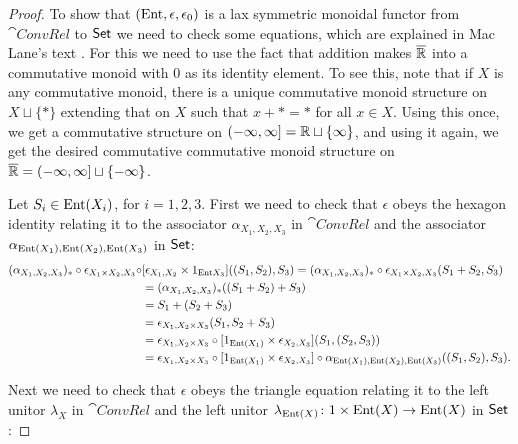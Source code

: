 \documentclass[12pt, reqno]{amsart}
\newcommand{\extreal}{\overline{\real}}
\newcommand{\convrelC}{\cat{ConvRel}}
\begin{document}
\begin{proof}
    To show that $(\mathrm{Ent},\epsilon,\epsilon_0)$ is a lax symmetric monoidal functor from $\convrelC$ to $\mathsf{Set}$ we need to check some equations, which are explained in Mac Lane's text \cite{MacLane}. For this we need to use the fact that addition makes $\extreal$ into a commutative monoid with $0$ as its identity element. To see this, note that if $X$ is any commutative monoid, there is a unique commutative monoid structure on $X \sqcup \{\ast\}$ extending that on $X$ such that $x + \ast = \ast$ for all $x \in X$. Using this once, we get a commutative structure on $(-\infty,\infty] = \mathbb{R} \sqcup \{\infty\}$, and using it again, we get the desired commutative commutative monoid structure on $\extreal = (-\infty,\infty] \sqcup \{-\infty\}$. 
    
    Let $S_i \in \mathrm{Ent}(X_i)$, for $i=1,2,3$. First we need to check that $\epsilon$ obeys the hexagon identity relating it to the associator $\alpha_{X_1,X_2,X_3}$ in $\convrelC$ and the associator $\alpha_{\mathrm{Ent}(X_1),\mathrm{Ent}(X_2),\mathrm{Ent}(X_3)}$ in $\mathsf{Set}$:
\begin{align*}
        (\alpha_{X_1, X_2, X_3})_* \circ \epsilon_{X_1 \times X_2, X_3} \circ & [\epsilon_{X_1, X_2} \times 1_{\mathrm{Ent} X_3}] ((S_1, S_2), S_3)
        = (\alpha_{X_1, X_2, X_3})_* \circ \epsilon_{X_1 \times X_2, X_3} (S_1+S_2, S_3) \\
  &= (\alpha_{X_1, X_2, X_3})_* ((S_1+S_2)+S_3) \\
&= S_1+(S_2+S_3) \\
&= \epsilon_{X_1, X_2 \times X_3} (S_1, S_2+S_3) \\
&=  \epsilon_{X_1, X_2 \times X_3} \circ [1_{\mathrm{Ent}(X_1)} \times \epsilon_{X_2, X_3}] (S_1, (S_2, S_3)) \\
&= \epsilon_{X_1, X_2 \times X_3} \circ [1_{\mathrm{Ent}(X_1)} \times \epsilon_{X_2, X_3}] \circ \alpha_{\mathrm{Ent}(X_1), \mathrm{Ent}(X_2), \mathrm{Ent}(X_3)}((S_1, S_2), S_3).
\end{align*}
    
Next we need to check that $\epsilon$ obeys the triangle equation relating it to the left unitor $\lambda_X$ in $\convrelC$ and the left unitor $\lambda_{\mathrm{Ent}(X)} \colon 1 \times \mathrm{Ent}(X) \rightarrow \mathrm{Ent}(X)$ in $\mathsf{Set}$:


\end{proof}
\end{document}
